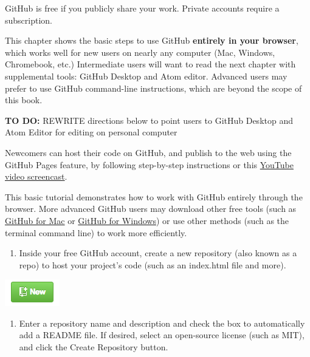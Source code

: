\documentclass[
  english,
]{book}
\providecommand{\tightlist}{%
  \setlength{\itemsep}{0pt}\setlength{\parskip}{0pt}}
\begin{document}
GitHub is free if you publicly share your work. Private accounts require a subscription.

This chapter shows the basic steps to use GitHub \textbf{entirely in your browser}, which works well for new users on nearly any computer (Mac, Windows, Chromebook, etc.) Intermediate users will want to read the next chapter with supplemental tools: GitHub Desktop and Atom editor. Advanced users may prefer to use GitHub command-line instructions, which are beyond the scope of this book.

\textbf{TO DO:} REWRITE directions below to point users to GitHub Desktop and Atom Editor for editing on personal computer

Newcomers can host their code on GitHub, and publish to the web using the GitHub Pages feature, by following step-by-step instructions or this \href{http://youtu.be/ZVejLE8qtOI}{YouTube video screencast}.

This basic tutorial demonstrates how to work with GitHub entirely through the browser. More advanced GitHub users may download other free tools (such as \href{https://mac.github.com}{GitHub for Mac} or \href{https://windows.github.com}{GitHub for Windows}) or use other methods (such as the terminal command line) to work more efficiently.

\begin{enumerate}
\def\labelenumi{\arabic{enumi})}
\tightlist
\item
  Inside your free GitHub account, create a new repository (also known as a repo) to host your project's code (such as an index.html file and more).
\end{enumerate}

\includegraphics{images/08-github/GitHub-NewRepo.png}

\begin{enumerate}
\def\labelenumi{\arabic{enumi})}
\setcounter{enumi}{1}
\tightlist
\item
  Enter a repository name and description and check the box to automatically add a README file. If desired, select an open-source license (such as MIT), and click the Create Repository button.
\end{enumerate}
\end{document}
